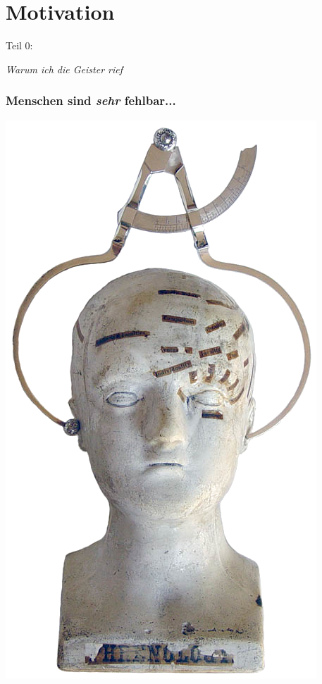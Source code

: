 \documentclass[aspectratio=169,usenames,dvipsnames]{beamer}
\begin{document}

\section{Motivation}
\begin{frame}
\begin{center}
\Large
Teil 0:
\bigskip

\huge
\emph{Warum ich die Geister rief}
\end{center}
\end{frame}


\begin{frame}
\frametitle{Menschen sind \emph{sehr} fehlbar...}
\begin{minipage}{0.5\textwidth}
\begin{center}
\includegraphics[keepaspectratio, height=0.75\textheight]{images/calipers_transparent}

\end{center}
\end{minipage}
\end{frame}
\end{document}
